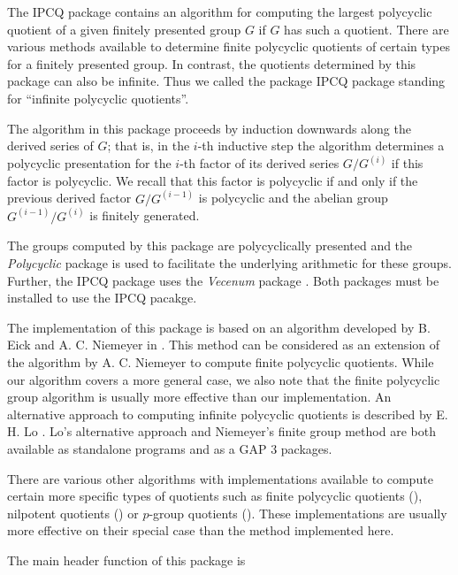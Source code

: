 
The IPCQ package contains an algorithm for computing the largest polycyclic 
quotient of a given finitely presented group $G$ if $G$ has such a quotient.
There are various methods available to determine finite polycyclic quotients
of certain types for a finitely presented group. In contrast, the quotients 
determined by this package can also be infinite. Thus we called the package 
IPCQ package standing for ``infinite polycyclic quotients''.

The algorithm in this package proceeds by induction downwards along the 
derived series of $G$; that is, in the $i$-th inductive step the algorithm 
determines a polycyclic presentation for the $i$-th factor of its derived 
series $G/G^{(i)}$ if this factor is polycyclic. We recall that this factor
is polycyclic if and only if the previous derived factor $G / G^{(i-1)}$ is 
polycyclic and the abelian group $G^{(i-1)}/ G^{(i)}$ is finitely generated.

The groups computed by this package are polycyclically presented and the 
{\it Polycyclic} package \cite{polycyc} is used to facilitate the underlying 
arithmetic for these groups. Further, the IPCQ package uses the {\it Vecenum} 
package \cite{ve}. Both packages must be installed to use the IPCQ pacakge.

The implementation of this package is based on an algorithm developed by
B. Eick and A. C. Niemeyer in \cite{ENi00}. This method can be considered
as an extension of the algorithm by A. C. Niemeyer \cite{Nie94} to compute 
finite polycyclic quotients. While our algorithm covers a more general case,
we also note that the finite polycyclic group algorithm is usually more 
effective than our implementation. An alternative approach to computing
infinite polycyclic quotients is described by E. H. Lo \cite{Lo98b}. Lo's
alternative approach and Niemeyer's finite group method are both available 
as standalone programs and as a GAP 3 packages. 

There are various other algorithms with implementations available to 
compute certain more specific types of quotients such as finite polycyclic
quotients (\cite{Nie94, Ple87}), nilpotent quotients (\cite{Nic95}) or
$p$-group quotients (\cite{NOb96}). These implementations are usually more
effective on their special case than the method implemented here.


The main header function of this package is

